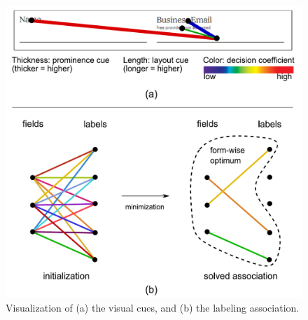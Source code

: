 \begin{figure}[t]
	\centering
	\includegraphics[width=0.86\linewidth]{accessibility_repair/figures/illustration/illustration.pdf}
	\caption{Visualization of (a) the visual cues, and (b) the labeling association. }
	\label{fig:illustration}
\end{figure}

